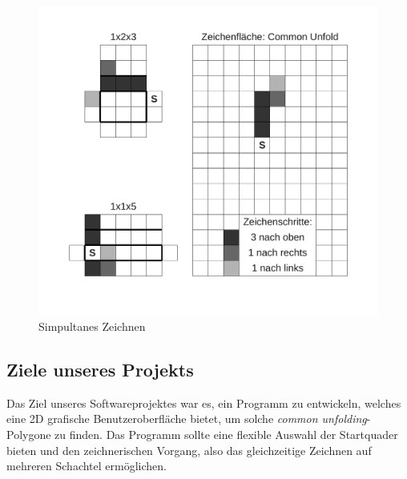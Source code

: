\begin{figure}[htbp]
\centering
\includegraphics[scale=0.5]{03_pics/simulatnes_zeichnen.pdf}
\caption{Simpultanes Zeichnen}
\label{fig:Simpultanes-Zeichnen}
\end{figure}


\subsection{Ziele unseres Projekts}
\label{subsec:ziele}

Das Ziel unseres Softwareprojektes war es, ein Programm zu entwickeln, welches eine 2D grafische Benutzeroberfläche bietet, um solche \emph{common unfolding}-Polygone zu finden. Das Programm sollte eine flexible Auswahl der Startquader bieten und den zeichnerischen Vorgang, also das gleichzeitige Zeichnen auf mehreren Schachtel ermöglichen.

\newpage


